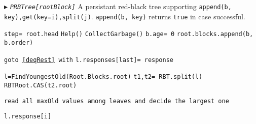 \documentclass[10pt]{article}
\theoremstyle{definition}
\begin{document}
\begin{algorithm}
\begin{algorithmic}[1]
\begin{multicols}{2}

\Statex $\blacktriangleright$ \texttt{\textsl{PRBTree[rootBlock]}}
  \Statex \textsf{A persistant red-black tree supporting \texttt{append(b, key),get(key=i),split(j)}}. \texttt{append(b, key)} returns \texttt{true} in case successful.






 
\State \texttt{step= root.head}
\State \texttt{Help()}
\State \texttt{CollectGarbage()}
\EndIf
\State \texttt{b.age= 0}
\State \Return \texttt{root.blocks.append(b, b.order)}
\Statex


 
\State \texttt{goto \ref{deqRest} with} 
\State \texttt{l.responses[last]= response}
\EndIf
\EndIf
\EndFor
{}
\Statex

\State \texttt{l=FindYoungestOld(Root.Blocks.root)}
\State \texttt{t1,t2= RBT.split(l)}
\State \texttt{RBTRoot.CAS(t2.root)}

\Statex

\State\Return  \texttt{read all maxOld values among leaves and decide the largest one} 

\Statex



\State \Return \texttt{l.response[i]}
\EndIf


\end{multicols}
\end{algorithmic}
\end{algorithm}
\end{document}
